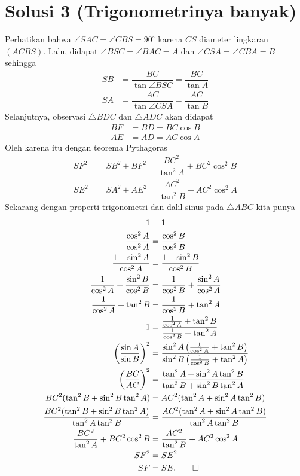 \section{Solusi 3 (Trigonometrinya banyak)}
Perhatikan bahwa $\angle SAC = \angle CBS = 90^\circ$ karena $CS$ diameter lingkaran $(ACBS)$. Lalu, didapat $\angle BSC = \angle BAC = A$ dan $\angle CSA = \angle CBA = B$ sehingga
\begin{align*}
    SB &= \dfrac{BC}{\tan \angle BSC} = \dfrac{BC}{\tan A}\\
    SA &= \dfrac{AC}{\tan \angle CSA} = \dfrac{AC}{\tan B}
\end{align*}
Selanjutnya, observasi $\triangle BDC$ dan $\triangle ADC$ akan didapat
\begin{align*}
    BF &= BD = BC \cos B\\
    AE &= AD = AC \cos A
\end{align*}
Oleh karena itu dengan teorema Pythagoras
\begin{align*}
    SF^2 &= SB^2 + BF^2 = \dfrac{BC^2}{\tan^2 A} + BC^2 \cos^2 B\\
    SE^2 &= SA^2 + AE^2 = \dfrac{AC^2}{\tan^2 B} + AC^2 \cos^2 A
\end{align*}
Sekarang dengan properti trigonometri dan dalil sinus pada $\triangle ABC$ kita punya
\begin{align*}
    1 &= 1\\
    \dfrac{\cos^2 A}{\cos^2 A} &= \dfrac{\cos^2 B}{\cos^2 B}\\
    \dfrac{1-\sin^2 A}{\cos^2 A} &= \dfrac{1-\sin^2 B}{\cos^2 B}\\
    \dfrac{1}{\cos^2 A}+\dfrac{\sin^2 B}{\cos^2 B} &= \dfrac{1}{\cos^2 B}+\dfrac{\sin^2 A}{\cos^2 A}\\
    \dfrac{1}{\cos^2 A}+\tan^2 B &= \dfrac{1}{\cos^2 B}+\tan^2 A\\
    1 &= \dfrac{\frac{1}{\cos^2 A}+\tan^2 B}{\frac{1}{\cos^2 B}+\tan^2 A}\\
    \left(\dfrac{\sin A}{\sin B}\right)^2 &= \dfrac{\sin^2 A\left(\frac{1}{\cos^2 A}+\tan^2 B\right)}{\sin^2 B\left(\frac{1}{\cos^2 B}+\tan^2 A\right)}\\
    \left(\dfrac{BC}{AC}\right)^2 &= \dfrac{\tan^2 A + \sin^2 A \tan^2 B}{\tan^2 B + \sin^2 B \tan^2 A}\\
    BC^2(\tan^2 B + \sin^2 B \tan^2 A) &= AC^2(\tan^2 A + \sin^2 A \tan^2 B)\\
    \dfrac{BC^2(\tan^2 B + \sin^2 B \tan^2 A)}{\tan^2 A \tan^2 B} &= \dfrac{AC^2(\tan^2 A + \sin^2 A \tan^2 B)}{\tan^2 A \tan^2 B}\\
    \dfrac{BC^2}{\tan^2 A} + BC^2 \cos^2 B &= \dfrac{AC^2}{\tan^2 B} + AC^2 \cos^2 A\\
    SF^2 &= SE^2\\
    SF &= SE. \qed
\end{align*}